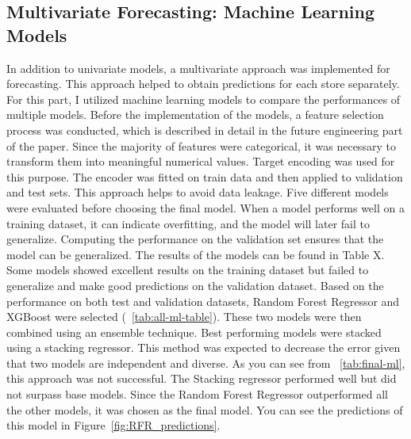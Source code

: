 \documentclass[conference]{IEEEtran}
\begin{document}

\subsection{Multivariate Forecasting: Machine Learning Models}
In addition to univariate models, a multivariate approach was implemented for forecasting. This approach helped to obtain predictions for each store separately. For this part, I utilized machine learning models to compare the performances of multiple models. Before the implementation of the models, a feature selection process was conducted, which is described in detail in the future engineering part of the paper. Since the majority of features were categorical, it was necessary to transform them into meaningful numerical values. Target encoding was used for this purpose. The encoder was fitted on train data and then applied to validation and test sets. This approach helps to avoid data leakage. Five different models were evaluated before choosing the final model. When a model performs well on a training dataset, it can indicate overfitting, and the model will later fail to generalize. Computing the performance on the validation set ensures that the model can be generalized. The results of the models can be found in Table X. Some models showed excellent results on the training dataset but failed to generalize and make good predictions on the validation dataset. 
Based on the performance on both test and validation datasets, Random Forest Regressor and XGBoost were selected (~\autoref{tab:all-ml-table}). These two models were then combined using an ensemble technique. Best performing models were stacked using a stacking regressor. This method was expected to decrease the error given that two models are independent and diverse. As you can see from ~\autoref{tab:final-ml}, this approach was not successful. The Stacking regressor performed well but did not surpass base models. Since the Random Forest Regressor outperformed all the other models, it was chosen as the final model. You can see the predictions of this model in Figure~\ref{fig:RFR_predictions}.

\end{document}

